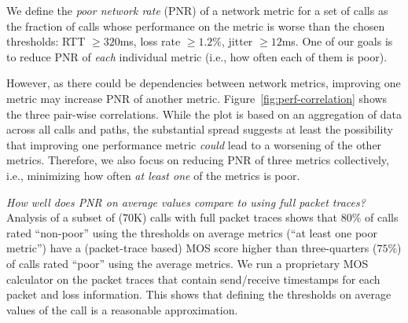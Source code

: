  

	 
We define the {\em poor network rate} (PNR) of a network 
metric for a set of calls as the fraction of calls whose performance 
on the metric is worse than the chosen thresholds: 
RTT $\geq 320$ms, loss rate $\geq 1.2\%$, jitter $\geq 12$ms. 
One of our goals is to reduce PNR of {\em each} individual metric 
 (i.e., how often each of them is poor). 

However, as there could be dependencies between network 
metrics, improving one metric may increase PNR of another 
metric. 
Figure~\ref{fig:perf-correlation} shows the three pair-wise 
correlations. 
While the plot is based on an aggregation of data across all 
calls and paths, the substantial spread suggests at least the 
possibility that improving one performance metric {\em could} 
lead to a worsening of the other metrics. 
Therefore, we also focus on reducing PNR of three metrics 
collectively, i.e., minimizing how often {\em at least one} of 
the metrics is poor.

{\em How well does PNR on average values compare to 
using full packet traces?} 
Analysis of a subset of ($70$K) calls with full packet traces 
shows that $80\%$ of calls rated ``non-poor'' using the 
thresholds on average metrics (``at least one poor metric'') 
have a (packet-trace based) MOS score higher than 
three-quarters ($75\%$) of calls rated ``poor'' using the 
average metrics. We run a proprietary MOS calculator 
on the packet traces that contain send/receive timestamps 
for each packet and loss information. 
This shows that defining the thresholds on average values 
of the call is a reasonable approximation.


